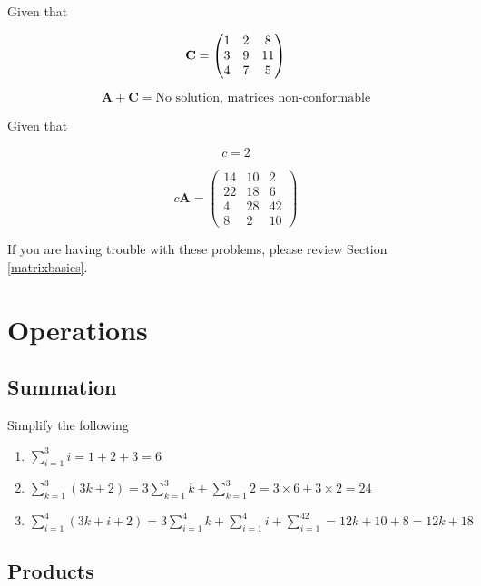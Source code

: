 \documentclass[]{book}
\theoremstyle{definition}
\theoremstyle{definition}
\theoremstyle{definition}
\theoremstyle{remark}
\begin{document}
Given that

\[{\bf C}=\begin{pmatrix}
            1 & 2 & 8 \\
            3 & 9 & 11 \\ 
            4 & 7 & 5 \\ 
        \end{pmatrix}\]

\[\mathbf{A} + \mathbf{C} = \text{No solution, matrices non-conformable}\]

Given that

\[c = 2\]

\[c\textbf{A} = \begin{pmatrix}
            14 & 10 & 2 \\
            22 & 18 & 6 \\ 
            4 & 28 & 42 \\ 
            8 & 2 & 10
        \end{pmatrix}\]

If you are having trouble with these problems, please review Section
\ref{matrixbasics}.

\section*{Operations}\label{operations-1}

\subsection*{Summation}\label{summation-1}

Simplify the following

\begin{enumerate}
\def\labelenumi{\arabic{enumi}.}
\item
  \(\sum\limits_{i = 1}^3 i = 1 + 2+ 3 = 6\)
\item
  \(\sum\limits_{k = 1}^3(3k + 2) = 3\sum\limits_{k=1}^3k + \sum\limits_{k=1}^3 2= 3\times 6 + 3\times 2 = 24\)
\item
  \(\sum\limits_{i= 1}^4 (3k + i + 2) = 3\sum\limits_{i= 1}^4k + \sum\limits_{i= 1}^4i + \sum\limits_{i= 1}^42 = 12k + 10 + 8 = 12k + 18\)
\end{enumerate}

\subsection*{Products}\label{products-1}
\end{document}
